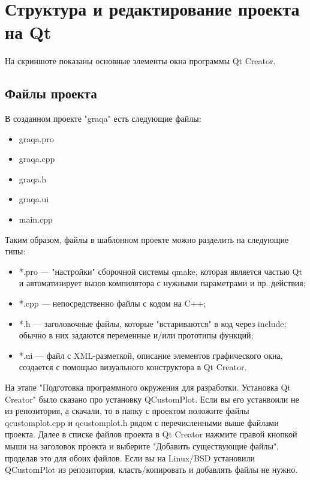 \section{Структура и редактирование проекта на Qt}

На скриншоте показаны основные элементы окна программы Qt Creator.

\subsection{Файлы проекта}
В созданном проекте "graqa" есть следующие файлы:

\begin{itemize}
  \item graqa.pro
  \item graqa.cpp
  \item graqa.h
  \item graqa.ui
  \item main.cpp
\end{itemize}

Таким образом, файлы в шаблонном проекте можно разделить на следующие типы:

\begin{itemize}
  \item *.pro — "настройки" сборочной системы qmake, которая является частью Qt и автоматизирует вызов компилятора с нужными параметрами и пр. действия;
  \item *.cpp — непосредственно файлы с кодом на C++;
  \item *.h — заголовочные файлы, которые "встариваются" в код через include; обычно в них задаются переменные и/или прототипы функций;
  \item *.ui — файл с XML-разметкой, описание элементов графического окна, создается с помощью визуального конструктора в Qt Creator.
\end{itemize}

На этапе "Подготовка программного окружения для разработки. Установка Qt Creator" было сказано про установку QCustomPlot. Если вы его устанвоили не из репозитория, а скачали, то в папку с проектом положите файлы qcustomplot.cpp и qcustomplot.h рядом с перечисленными выше файлами проекта. Далее в списке файлов проекта в Qt Creator нажмите правой кнопкой мыши на заголовок проекта и выберите "Добавить существующие файлы", проделав это для обоих файлов. Если вы на Linux/BSD установили QCustomPlot из репозитория, класть/копировать и добавлять файлы не нужно.

